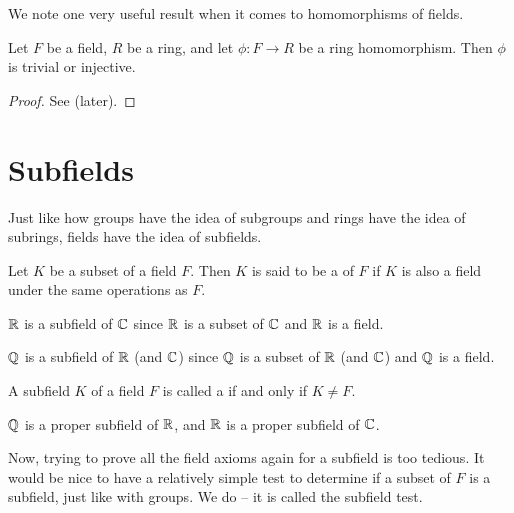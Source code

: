 We note one very useful result when it comes to homomorphisms of fields.
\begin{theorem}\label{thrm-homomorphism-from-field-is-injective-or-trivial}
    Let $F$ be a field, $R$ be a ring, and let $\phi: F \to R$ be a ring homomorphism. Then $\phi$ is trivial or injective.
\end{theorem}
\begin{proof}
    See  (later).
\end{proof}

\section{Subfields}
Just like how groups have the idea of subgroups and rings have the idea of subrings, fields have the idea of subfields.
\begin{definition}
    Let $K$ be a subset of a field $F$. Then $K$ is said to be a  of $F$ if $K$ is also a field under the same operations as $F$.
\end{definition}

\begin{example}
    $\mathbb{R}$ is a subfield of $\mathbb{C}$ since $\mathbb{R}$ is a subset of $\mathbb{C}$ and $\mathbb{R}$ is a field.
\end{example}
\begin{example}
    $\mathbb{Q}$ is a subfield of $\mathbb{R}$ (and $\mathbb{C}$) since $\mathbb{Q}$ is a subset of $\mathbb{R}$ (and $\mathbb{C}$) and $\mathbb{Q}$ is a field.
\end{example}

\begin{definition}
    A subfield $K$ of a field $F$ is called a  if and only if $K \neq F$.
\end{definition}

\begin{example}
    $\mathbb{Q}$ is a proper subfield of $\mathbb{R}$, and $\mathbb{R}$ is a proper subfield of $\mathbb{C}$.
\end{example}

Now, trying to prove all the field axioms again for a subfield is too tedious. It would be nice to have a relatively simple test to determine if a subset of $F$ is a subfield, just like with groups. We do -- it is called the subfield test.


